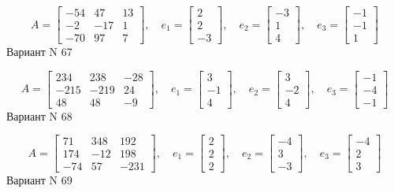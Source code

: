 \documentclass[11pt]{report}
\begin{document}
$$A = \left[\begin{matrix}-54 & 47 & 13\\-2 & -17 & 1\\-70 & 97 & 7\end{matrix}\right],\quad e_1 = \left[\begin{matrix}2\\2\\-3\end{matrix}\right],\quad e_2 = \left[\begin{matrix}-3\\1\\4\end{matrix}\right],\quad e_3 = \left[\begin{matrix}-1\\-1\\1\end{matrix}\right]$$Вариант N 67

$$A = \left[\begin{matrix}234 & 238 & -28\\-215 & -219 & 24\\48 & 48 & -9\end{matrix}\right],\quad e_1 = \left[\begin{matrix}3\\-1\\4\end{matrix}\right],\quad e_2 = \left[\begin{matrix}3\\-2\\4\end{matrix}\right],\quad e_3 = \left[\begin{matrix}-1\\-4\\-1\end{matrix}\right]$$Вариант N 68

$$A = \left[\begin{matrix}71 & 348 & 192\\174 & -12 & 198\\-74 & 57 & -231\end{matrix}\right],\quad e_1 = \left[\begin{matrix}2\\2\\2\end{matrix}\right],\quad e_2 = \left[\begin{matrix}-4\\3\\-3\end{matrix}\right],\quad e_3 = \left[\begin{matrix}-4\\2\\3\end{matrix}\right]$$Вариант N 69
\end{document}
